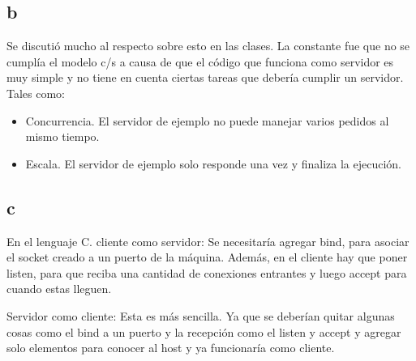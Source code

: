 \documentclass{article}
\begin{document}
	\subsection{b}
	Se discutió mucho al respecto sobre esto en las clases. La constante fue que no se cumplía el modelo c/s a causa de que el código que funciona como servidor es muy simple y no tiene en cuenta ciertas tareas que debería cumplir un servidor.
	Tales como:
	\begin{itemize}
		\item Concurrencia. El servidor de ejemplo no puede manejar varios pedidos al mismo tiempo.
		\item Escala. El servidor de ejemplo solo responde una vez y finaliza la ejecución.
	\end{itemize}
	
	\subsection{c}
	En el lenguaje C.
	cliente como servidor: Se necesitaría agregar bind, para asociar el socket creado a un puerto de la máquina. Además, en el cliente hay que poner listen, para que reciba una cantidad de conexiones entrantes y luego accept para cuando estas lleguen.
	
	Servidor como cliente: Esta es más sencilla. Ya que se deberían quitar algunas cosas como el bind a un puerto y la recepción como el listen y accept y agregar solo elementos para conocer al host y ya funcionaría como cliente.
	
	
\end{document}
